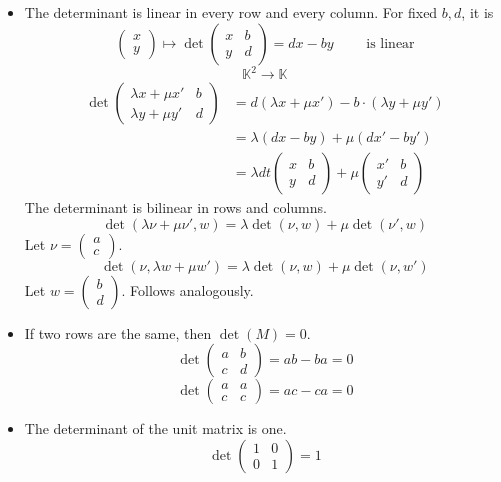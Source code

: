 \documentclass{article}
\newcommand{\vectwo}[2]{\begin{pmatrix} #1 \\ #2 \end{pmatrix}}
\begin{document}
\begin{itemize}
  \item The determinant is linear in every row and every column.
    For fixed $b, d$, it is
    \[ \vectwo xy \mapsto \det{\begin{pmatrix} x & b \\ y & d \end{pmatrix}} = dx - by \qquad \text{ is linear} \]
    \[ \mathbb K^2 \to \mathbb K \]
    \begin{align*}
      \det{\begin{pmatrix} \lambda x + \mu x' & b \\ \lambda y + \mu y' & d \end{pmatrix}}
        &= d(\lambda x + \mu x') - b \cdot (\lambda y + \mu y') \\
        &= \lambda (dx - by) + \mu (dx' - by') \\
        &= \lambda dt \begin{pmatrix} x & b \\ y & d \end{pmatrix} + \mu \begin{pmatrix} x' & b \\  y' & d \end{pmatrix}
    \end{align*}
    The determinant is bilinear in rows and columns.
    \[ \det(\lambda \nu + \mu \nu', w) = \lambda \det(\nu, w) + \mu \det(\nu', w) \]
    Let $\nu = \vectwo{a}{c}$.
    \[ \det(\nu, \lambda w + \mu w') = \lambda \det(\nu, w) + \mu \det(\nu, w') \]
    Let $w = \vectwo bd$.
    Follows analogously.
  \item If two rows are the same, then $\det(M) = 0$.
    \[ \det\begin{pmatrix} a & b \\ c & d \end{pmatrix} = ab - ba = 0 \]
    \[ \det\begin{pmatrix} a & a \\ c & c \end{pmatrix} = ac - ca = 0 \]
  \item The determinant of the unit matrix is one.
    \[ \det\begin{pmatrix} 1 & 0 \\ 0 & 1 \end{pmatrix} = 1 \]
\end{itemize}
\end{document}
